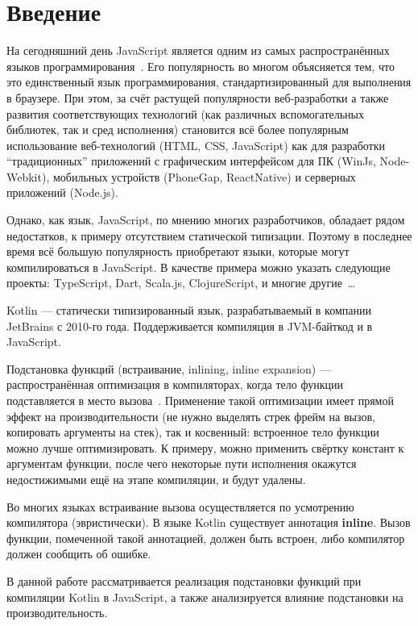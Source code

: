 \section*{Введение}

На сегодняшний день JavaScript является одним из самых
распространённых языков программирования~\cite{TIOBE,LANGPOP}.
Его популярность во многом объясняется тем, что это единственный
язык программирования, стандартизированный для выполнения в браузере.
При этом, за счёт растущей популярности веб-разработки а также
развития соответствующих технологий
(как различных вспомогательных библиотек,
так и сред исполнения) становится всё более популярным
использование веб-технологий (HTML, CSS, JavaScript)
как для разработки ``традиционных'' приложений с
графическим интерфейсом для ПК (WinJs, Node-Webkit),
мобильных устройств (PhoneGap, ReactNative) и серверных приложений
(Node.js).

Однако, как язык, JavaScript, по мнению многих разработчиков,
обладает рядом недостатков,
к примеру отсутствием статической типизации.
Поэтому в последнее время всё большую популярность
приобретают языки, которые могут компилироваться в JavaScript.
В качестве примера можно указать следующие проекты: TypeScript,
Dart, Scala.js, ClojureScript, и многие другие~\cite{TARGET_JS}\ldots

Kotlin --- статически типизированный язык, разрабатываемый
в компании JetBrains с 2010-го года. Поддерживается компиляция
в JVM-байткод и в JavaScript.

Подстановка функций (встраивание, inlining, inline expansion) --- распространённая
оптимизация в компиляторах, когда тело функции подставляется
в место вызова~\cite{WIKI_INLINE}. Применение такой оптимизации
имеет прямой эффект на производительности (не нужно выделять стрек
фрейм на вызов, копировать аргументы на стек), так и косвенный:
встроенное тело функции можно лучше оптимизировать.
К примеру, можно применить свёртку констант к аргументам функции,
после чего некоторые пути исполнения окажутся недостижимыми
ещё на этапе компиляции, и будут удалены.

Во многих языках встраивание вызова осуществляется по усмотрению
компилятора (эвристически). В языке Kotlin существует аннотация
\textbf{inline}. Вызов функции, помеченной такой аннотацией,
должен быть встроен, либо компилятор должен сообщить об ошибке.

В данной работе рассматривается реализация подстановки функций
при компиляции Kotlin в JavaScript, а также анализируется
влияние подстановки на производительность.
